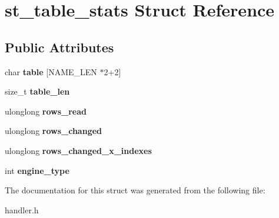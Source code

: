 \hypertarget{structst__table__stats}{}\section{st\+\_\+table\+\_\+stats Struct Reference}
\label{structst__table__stats}
\subsection*{Public Attributes}
\begin{DoxyCompactItemize}
\item 
\mbox{\label{structst__table__stats_a34d0fa1991354396a2183996732ad6c0}} 
char {\bfseries table} \mbox{[}N\+A\+M\+E\+\_\+\+L\+EN $\ast$2+2\mbox{]}
\item 
\mbox{\label{structst__table__stats_a58d7f87f9d1bafd35e7c24ad0fd6a831}} 
size\+\_\+t {\bfseries table\+\_\+len}
\item 
\mbox{\label{structst__table__stats_a1c53106cce83f14ec0f858b8f3a0fb4c}} 
ulonglong {\bfseries rows\+\_\+read}
\item 
\mbox{\label{structst__table__stats_a2c533e500148d6c4b53ebba994ccbfb6}} 
ulonglong {\bfseries rows\+\_\+changed}
\item 
\mbox{\label{structst__table__stats_a42fcf80a427659f16f830552fc60c60a}} 
ulonglong {\bfseries rows\+\_\+changed\+\_\+x\+\_\+indexes}
\item 
\mbox{\label{structst__table__stats_adcb8ce6c8c1a271c908dbfc19816b0a0}} 
int {\bfseries engine\+\_\+type}
\end{DoxyCompactItemize}


The documentation for this struct was generated from the following file\+:\begin{DoxyCompactItemize}
\item 
handler.\+h\end{DoxyCompactItemize}
